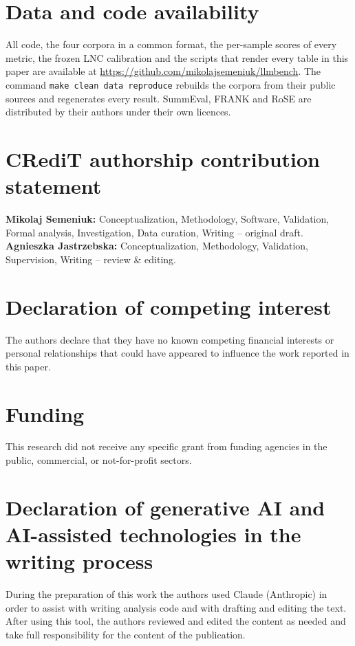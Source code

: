\section*{Data and code availability}
All code, the four corpora in a common format, the per-sample scores of every metric, the frozen LNC calibration and the scripts that render every table in this paper are available at \url{https://github.com/mikolajsemeniuk/llmbench}. The command \texttt{make clean data reproduce} rebuilds the corpora from their public sources and regenerates every result. SummEval, FRANK and RoSE are distributed by their authors under their own licences.

\section*{CRediT authorship contribution statement}
\textbf{Mikolaj Semeniuk:} Conceptualization, Methodology, Software, Validation, Formal analysis, Investigation, Data curation, Writing -- original draft. \textbf{Agnieszka Jastrzebska:} Conceptualization, Methodology, Validation, Supervision, Writing -- review \& editing.

\section*{Declaration of competing interest}
The authors declare that they have no known competing financial interests or personal relationships that could have appeared to influence the work reported in this paper.

\section*{Funding}
This research did not receive any specific grant from funding agencies in the public, commercial, or not-for-profit sectors.

\section*{Declaration of generative AI and AI-assisted technologies in the writing process}
During the preparation of this work the authors used Claude (Anthropic) in order to assist with writing analysis code and with drafting and editing the text. After using this tool, the authors reviewed and edited the content as needed and take full responsibility for the content of the publication.
